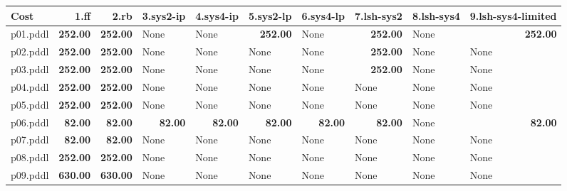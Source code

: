 \documentclass{article}
\begin{document}
\begin{tabular}{@{}lrrrrrrrrr@{}}
Cost & 1.ff & 2.rb & 3.sys2-ip & 4.sys4-ip & 5.sys2-lp & 6.sys4-lp & 7.lsh-sys2 & 8.lsh-sys4 & 9.lsh-sys4-limited \\
\midrule
p01.pddl & \textbf{252.00} & \textbf{252.00} & \multicolumn{1}{|l|}{None} & \multicolumn{1}{|l|}{None} & \textbf{252.00} & \multicolumn{1}{|l|}{None} & \textbf{252.00} & \multicolumn{1}{|l|}{None} & \textbf{252.00} \\
p02.pddl & \textbf{252.00} & \textbf{252.00} & \multicolumn{1}{|l|}{None} & \multicolumn{1}{|l|}{None} & \multicolumn{1}{|l|}{None} & \multicolumn{1}{|l|}{None} & \textbf{252.00} & \multicolumn{1}{|l|}{None} & \multicolumn{1}{|l|}{None} \\
p03.pddl & \textbf{252.00} & \textbf{252.00} & \multicolumn{1}{|l|}{None} & \multicolumn{1}{|l|}{None} & \multicolumn{1}{|l|}{None} & \multicolumn{1}{|l|}{None} & \textbf{252.00} & \multicolumn{1}{|l|}{None} & \multicolumn{1}{|l|}{None} \\
p04.pddl & \textbf{252.00} & \textbf{252.00} & \multicolumn{1}{|l|}{None} & \multicolumn{1}{|l|}{None} & \multicolumn{1}{|l|}{None} & \multicolumn{1}{|l|}{None} & \multicolumn{1}{|l|}{None} & \multicolumn{1}{|l|}{None} & \multicolumn{1}{|l|}{None} \\
p05.pddl & \textbf{252.00} & \textbf{252.00} & \multicolumn{1}{|l|}{None} & \multicolumn{1}{|l|}{None} & \multicolumn{1}{|l|}{None} & \multicolumn{1}{|l|}{None} & \multicolumn{1}{|l|}{None} & \multicolumn{1}{|l|}{None} & \multicolumn{1}{|l|}{None} \\
p06.pddl & \textbf{82.00} & \textbf{82.00} & \textbf{82.00} & \textbf{82.00} & \textbf{82.00} & \textbf{82.00} & \textbf{82.00} & \multicolumn{1}{|l|}{None} & \textbf{82.00} \\
p07.pddl & \textbf{82.00} & \textbf{82.00} & \multicolumn{1}{|l|}{None} & \multicolumn{1}{|l|}{None} & \multicolumn{1}{|l|}{None} & \multicolumn{1}{|l|}{None} & \multicolumn{1}{|l|}{None} & \multicolumn{1}{|l|}{None} & \multicolumn{1}{|l|}{None} \\
p08.pddl & \textbf{252.00} & \textbf{252.00} & \multicolumn{1}{|l|}{None} & \multicolumn{1}{|l|}{None} & \multicolumn{1}{|l|}{None} & \multicolumn{1}{|l|}{None} & \multicolumn{1}{|l|}{None} & \multicolumn{1}{|l|}{None} & \multicolumn{1}{|l|}{None} \\
p09.pddl & \textbf{630.00} & \textbf{630.00} & \multicolumn{1}{|l|}{None} & \multicolumn{1}{|l|}{None} & \multicolumn{1}{|l|}{None} & \multicolumn{1}{|l|}{None} & \multicolumn{1}{|l|}{None} & \multicolumn{1}{|l|}{None} & \multicolumn{1}{|l|}{None} \\

\end{tabular}
\end{document}
